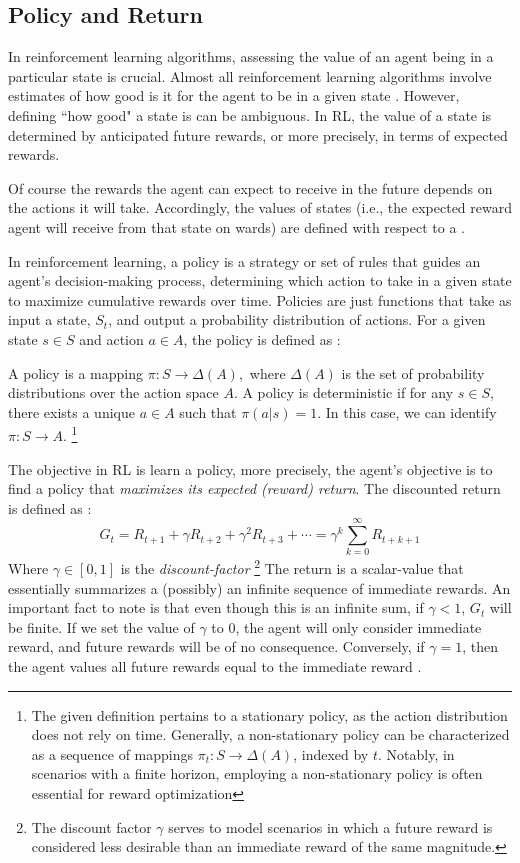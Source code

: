 \subsection{Policy and Return}
In reinforcement learning algorithms, assessing the value of an agent being in a particular state is crucial. 
Almost all reinforcement learning algorithms involve estimates of how good is it for the agent to be in a given state \cite{RL}.
However, defining ``how good" a state is can be ambiguous. In RL, the value of a state is determined by anticipated future rewards, or more precisely, in terms of expected rewards.

Of course the rewards the agent can expect to receive in the future depends on the actions it will take. Accordingly, the values of states (i.e., the expected reward agent will receive from that state on wards) are defined with respect to a .

In reinforcement learning, a policy is a strategy or set of rules that guides an agent's decision-making process, determining which action to take in a given state to maximize cumulative rewards over time. Policies are just functions that take as input a state, $S_t$, and output a probability distribution of actions.
For a given state $s \in S$ and action $a \in A$, the policy is defined as \cite{mohri2018}:
\begin{definition}[Policy]
    A policy is a mapping $\pi: S \to \Delta(A),$ where $\Delta(A)$ is the set of probability distributions over the action space $A$. A policy is deterministic if for any $s \in S$, there exists a unique $a \in A$ such that $\pi(a|s) = 1$. In this case, we can identify $\pi: S \to A$.
    \footnote{The given definition pertains to a stationary policy, as the action distribution does not rely on time. Generally, a non-stationary policy can be characterized as a sequence of mappings $\pi_t : S \rightarrow \Delta(A)$, indexed by $t$. Notably, in scenarios with a finite horizon, employing a non-stationary policy is often essential for reward optimization}
\end{definition}
The objective in RL is learn a policy, more precisely, the agent's objective is to find a policy that \textit{maximizes its expected (reward) return}. The discounted return is defined as \cite{RL}:
\begin{equation}
    G_t = R_{t+1} + \gamma R_{t+2 } + \gamma^2 R_{t+3 } + \cdots = \gamma^k \sum_{k=0}^{\infty} R_{t+k+1}
\end{equation}
Where $\gamma \in [0,1]$ is the \textit{discount-factor} \footnote{ The discount factor $\gamma$ serves to model scenarios in which a future reward is considered less desirable than an immediate reward of the same magnitude.}
The return is a scalar-value that essentially summarizes a (possibly) an infinite sequence of immediate rewards. 
An important fact to note is that even though this is an infinite sum, if $\gamma < 1$, $G_t$ will be finite. If we set the value of $\gamma$ to $0$, the agent will only consider immediate reward, and future rewards will be of no consequence. Conversely, if $\gamma = 1$, then the agent values all future rewards equal to the immediate reward \cite{RL}.


